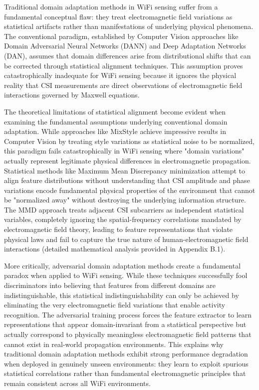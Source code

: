\documentclass[journal]{IEEEtran}
\begin{document}
Traditional domain adaptation methods in WiFi sensing suffer from a fundamental conceptual flaw: they treat electromagnetic field variations as statistical artifacts rather than manifestations of underlying physical phenomena. The conventional paradigm, established by Computer Vision approaches like Domain Adversarial Neural Networks (DANN) \cite{ganin2016domain} and Deep Adaptation Networks (DAN), assumes that domain differences arise from distributional shifts that can be corrected through statistical alignment techniques. This assumption proves catastrophically inadequate for WiFi sensing because it ignores the physical reality that CSI measurements are direct observations of electromagnetic field interactions governed by Maxwell equations.

The theoretical limitations of statistical alignment become evident when examining the fundamental assumptions underlying conventional domain adaptation. While approaches like MixStyle \cite{zhou2024mixstyle} achieve impressive results in Computer Vision by treating style variations as statistical noise to be normalized, this paradigm fails catastrophically in WiFi sensing where "domain variations" actually represent legitimate physical differences in electromagnetic propagation. Statistical methods like Maximum Mean Discrepancy minimization attempt to align feature distributions without understanding that CSI amplitude and phase variations encode fundamental physical properties of the environment that cannot be "normalized away" without destroying the underlying information structure. The MMD approach treats adjacent CSI subcarriers as independent statistical variables, completely ignoring the spatial-frequency correlations mandated by electromagnetic field theory, leading to feature representations that violate physical laws and fail to capture the true nature of human-electromagnetic field interactions (detailed mathematical analysis provided in Appendix B.1).

More critically, adversarial domain adaptation methods create a fundamental paradox when applied to WiFi sensing. While these techniques successfully fool discriminators into believing that features from different domains are indistinguishable, this statistical indistinguishability can only be achieved by eliminating the very electromagnetic field variations that enable activity recognition. The adversarial training process forces the feature extractor to learn representations that appear domain-invariant from a statistical perspective but actually correspond to physically meaningless electromagnetic field patterns that cannot exist in real-world propagation environments. This explains why traditional domain adaptation methods exhibit strong performance degradation when deployed in genuinely unseen environments: they learn to exploit spurious statistical correlations rather than fundamental electromagnetic principles that remain consistent across all WiFi environments.
\end{document}
